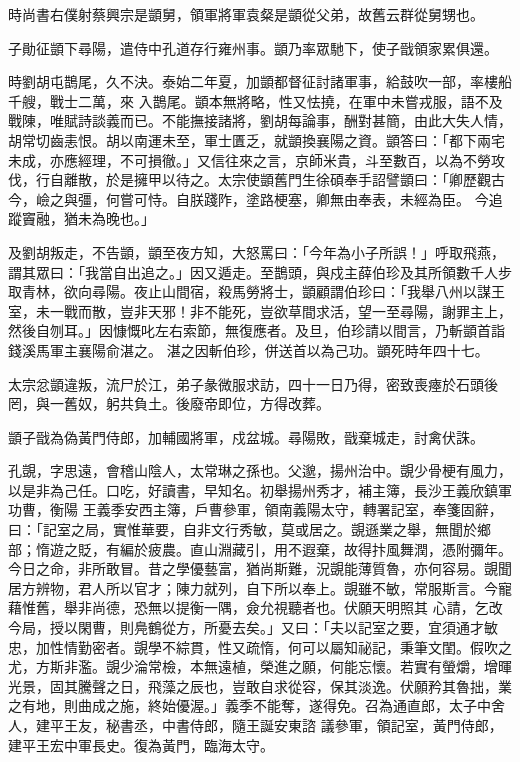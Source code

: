 \begin{pinyinscope}
 時尚書右僕射蔡興宗是顗舅，領軍將軍袁粲是顗從父弟，故舊云群從舅甥也。



 子勛征顗下尋陽，遣侍中孔道存行雍州事。顗乃率眾馳下，使子戩領家累俱還。



 時劉胡屯鵲尾，久不決。泰始二年夏，加顗都督征討諸軍事，給鼓吹一部，率樓船千艘，戰士二萬，來
 入鵲尾。顗本無將略，性又怯撓，在軍中未嘗戎服，語不及戰陳，唯賦詩談義而已。不能撫接諸將，劉胡每論事，酬對甚簡，由此大失人情，胡常切齒恚恨。胡以南運未至，軍士匱乏，就顗換襄陽之資。顗答曰：「都下兩宅未成，亦應經理，不可損徹。」又信往來之言，京師米貴，斗至數百，以為不勞攻伐，行自離散，於是擁甲以待之。太宗使顗舊門生徐碩奉手詔譬顗曰：「卿歷觀古今，嶮之與彊，何嘗可恃。自朕踐阼，塗路梗塞，卿無由奉表，未經為臣。
 今追蹤竇融，猶未為晚也。」



 及劉胡叛走，不告顗，顗至夜方知，大怒罵曰：「今年為小子所誤！」呼取飛燕，謂其眾曰：「我當自出追之。」因又遁走。至鵲頭，與戍主薛伯珍及其所領數千人步取青林，欲向尋陽。夜止山間宿，殺馬勞將士，顗顧謂伯珍曰：「我舉八州以謀王室，未一戰而散，豈非天邪！非不能死，豈欲草間求活，望一至尋陽，謝罪主上，然後自刎耳。」因慷慨叱左右索節，無復應者。及旦，伯珍請以間言，乃斬顗首詣錢溪馬軍主襄陽俞湛之。
 湛之因斬伯珍，併送首以為己功。顗死時年四十七。



 太宗忿顗違叛，流尸於江，弟子彖微服求訪，四十一日乃得，密致喪瘞於石頭後罔，與一舊奴，躬共負土。後廢帝即位，方得改葬。



 顗子戩為偽黃門侍郎，加輔國將軍，戍盆城。尋陽敗，戩棄城走，討禽伏誅。



 孔覬，字思遠，會稽山陰人，太常琳之孫也。父邈，揚州治中。覬少骨梗有風力，以是非為己任。口吃，好讀書，早知名。初舉揚州秀才，補主簿，長沙王義欣鎮軍功曹，衡陽
 王義季安西主簿，戶曹參軍，領南義陽太守，轉署記室，奉箋固辭，曰：「記室之局，實惟華要，自非文行秀敏，莫或居之。覬遜業之舉，無聞於鄉部；惰遊之貶，有編於疲農。直山淵藏引，用不遐棄，故得抃風舞潤，憑附彌年。今日之命，非所敢冒。昔之學優藝富，猶尚斯難，況覬能薄質魯，亦何容易。覬聞居方辨物，君人所以官才；陳力就列，自下所以奉上。覬雖不敏，常服斯言。今寵藉惟舊，舉非尚德，恐無以提衡一隅，僉允視聽者也。伏願天明照其
 心請，乞改今局，授以閑曹，則鳧鶴從方，所憂去矣。」又曰：「夫以記室之要，宜須通才敏忠，加性情勤密者。覬學不綜貫，性又疏惰，何可以屬知祕記，秉筆文閨。假吹之尤，方斯非濫。覬少淪常檢，本無遠植，榮進之願，何能忘懷。若實有螢爝，增暉光景，固其騰聲之日，飛藻之辰也，豈敢自求從容，保其淡逸。伏願矜其魯拙，業之有地，則曲成之施，終始優渥。」義季不能奪，遂得免。召為通直郎，太子中舍人，建平王友，秘書丞，中書侍郎，隨王誕安東諮
 議參軍，領記室，黃門侍郎，建平王宏中軍長史。復為黃門，臨海太守。




\end{pinyinscope}

